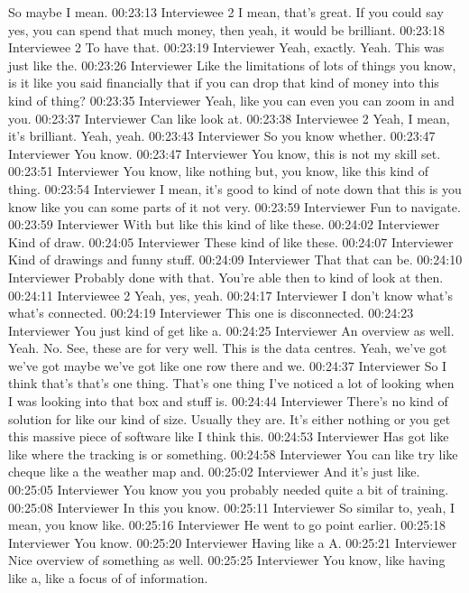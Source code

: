 So maybe I mean.
00:23:13 Interviewee 2 
I mean, that's great. If you could say yes, you can spend that much money, then yeah, it would be brilliant.
00:23:18 Interviewee 2 
To have that.
00:23:19 Interviewer
Yeah, exactly. Yeah. This was just like the.
00:23:26 Interviewer
Like the limitations of lots of things you know, is it like you said financially that if you can drop that kind of money into this kind of thing?
00:23:35 Interviewer
Yeah, like you can even you can zoom in and you.
00:23:37 Interviewer
Can like look at.
00:23:38 Interviewee 2 
Yeah, I mean, it's brilliant. Yeah, yeah.
00:23:43 Interviewer
So you know whether.
00:23:47 Interviewer
You know.
00:23:47 Interviewer
You know, this is not my skill set.
00:23:51 Interviewer
You know, like nothing but, you know, like this kind of thing.
00:23:54 Interviewer
I mean, it's good to kind of note down that this is you know like you can some parts of it not very.
00:23:59 Interviewer
Fun to navigate.
00:23:59 Interviewer
With but like this kind of like these.
00:24:02 Interviewer
Kind of draw.
00:24:05 Interviewer
These kind of like these.
00:24:07 Interviewer
Kind of drawings and funny stuff.
00:24:09 Interviewer
That that can be.
00:24:10 Interviewer
Probably done with that. You're able then to kind of look at then.
00:24:11 Interviewee 2 
Yeah, yes, yeah.
00:24:17 Interviewer
I don't know what's what's connected.
00:24:19 Interviewer
This one is disconnected.
00:24:23 Interviewer
You just kind of get like a.
00:24:25 Interviewer
An overview as well. Yeah. No. See, these are for very well. This is the data centres. Yeah, we've got we've got maybe we've got like one row there and we.
00:24:37 Interviewer
So I think that's that's one thing. That's one thing I've noticed a lot of looking when I was looking into that box and stuff is.
00:24:44 Interviewer
There's no kind of solution for like our kind of size. Usually they are. It's either nothing or you get this massive piece of software like I think this.
00:24:53 Interviewer
Has got like like where the tracking is or something.
00:24:58 Interviewer
You can like try like cheque like a the weather map and.
00:25:02 Interviewer
And it's just like.
00:25:05 Interviewer
You know you you probably needed quite a bit of training.
00:25:08 Interviewer
In this you know.
00:25:11 Interviewer
So similar to, yeah, I mean, you know like.
00:25:16 Interviewer
He went to go point earlier.
00:25:18 Interviewer
You know.
00:25:20 Interviewer
Having like a A.
00:25:21 Interviewer
Nice overview of something as well.
00:25:25 Interviewer
You know, like having like a, like a focus of of information.
